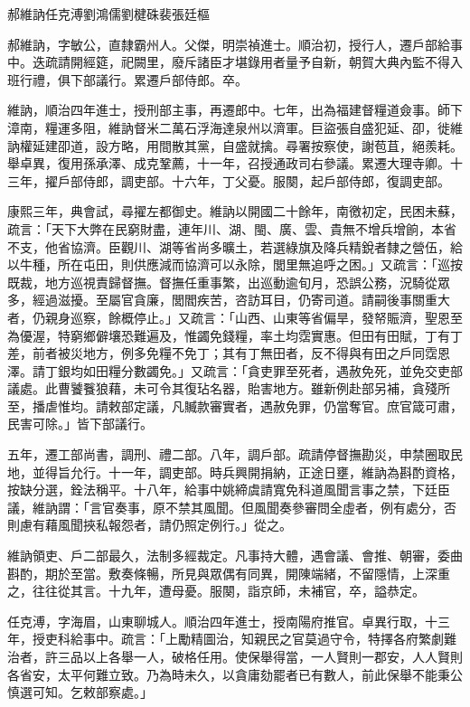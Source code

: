 
\begin{pinyinscope}
郝維訥任克溥劉鴻儒劉楗硃裴張廷樞

郝維訥，字敏公，直隸霸州人。父傑，明崇禎進士。順治初，授行人，遷戶部給事中。迭疏請開經筵，祀闕里，廢斥諸臣才堪錄用者量予自新，朝賀大典內監不得入班行禮，俱下部議行。累遷戶部侍郎。卒。

維訥，順治四年進士，授刑部主事，再遷郎中。七年，出為福建督糧道僉事。師下漳南，糧運多阻，維訥督米二萬石浮海達泉州以濟軍。巨盜張自盛犯延、卲，徙維訥權延建卲道，設方略，用間散其黨，自盛就擒。尋署按察使，謝苞苴，絕羨耗。舉卓異，復用孫承澤、成克鞏薦，十一年，召授通政司右參議。累遷大理寺卿。十三年，擢戶部侍郎，調吏部。十六年，丁父憂。服闋，起戶部侍郎，復調吏部。

康熙三年，典會試，尋擢左都御史。維訥以開國二十餘年，南徼初定，民困未蘇，疏言：「天下大弊在民窮財盡，連年川、湖、閩、廣、雲、貴無不增兵增餉，本省不支，他省協濟。臣觀川、湖等省尚多曠土，若選綠旗及降兵精銳者隸之營伍，給以牛種，所在屯田，則供應減而協濟可以永除，閭里無追呼之困。」又疏言：「巡按既裁，地方巡視責歸督撫。督撫任重事繁，出巡動逾旬月，恐誤公務，況騎從眾多，經過滋擾。至屬官貪廉，閭閻疾苦，咨訪耳目，仍寄司道。請嗣後事關重大者，仍親身巡察，餘概停止。」又疏言：「山西、山東等省偏旱，發帑賑濟，聖恩至為優渥，特窮鄉僻壤恐難遍及，惟蠲免錢糧，率土均霑實惠。但田有田賦，丁有丁差，前者被災地方，例多免糧不免丁；其有丁無田者，反不得與有田之戶同霑恩澤。請丁銀均如田糧分數蠲免。」又疏言：「貪吏罪至死者，遇赦免死，並免交吏部議處。此曹饕餮狼藉，未可令其復玷名器，貽害地方。雖新例赴部另補，貪殘所至，播虐惟均。請敕部定議，凡贓款審實者，遇赦免罪，仍當奪官。庶官箴可肅，民害可除。」皆下部議行。

五年，遷工部尚書，調刑、禮二部。八年，調戶部。疏請停督撫勘災，申禁圈取民地，並得旨允行。十一年，調吏部。時兵興開捐納，正途日壅，維訥為斟酌資格，按缺分選，銓法稱平。十八年，給事中姚締虞請寬免科道風聞言事之禁，下廷臣議，維訥謂：「言官奏事，原不禁其風聞。但風聞奏參審問全虛者，例有處分，否則慮有藉風聞挾私報怨者，請仍照定例行。」從之。

維訥領吏、戶二部最久，法制多經裁定。凡事持大體，遇會議、會推、朝審，委曲斟酌，期於至當。敷奏條暢，所見與眾偶有同異，開陳端緒，不留隱情，上深重之，往往從其言。十九年，遭母憂。服闋，詣京師，未補官，卒，謚恭定。

任克溥，字海眉，山東聊城人。順治四年進士，授南陽府推官。卓異行取，十三年，授吏科給事中。疏言：「上勵精圖治，知親民之官莫過守令，特擇各府繁劇難治者，許三品以上各舉一人，破格任用。使保舉得當，一人賢則一郡安，人人賢則各省安，太平何難立致。乃為時未久，以貪庸劾罷者已有數人，前此保舉不能秉公慎選可知。乞敕部察處。」


\end{pinyinscope}

